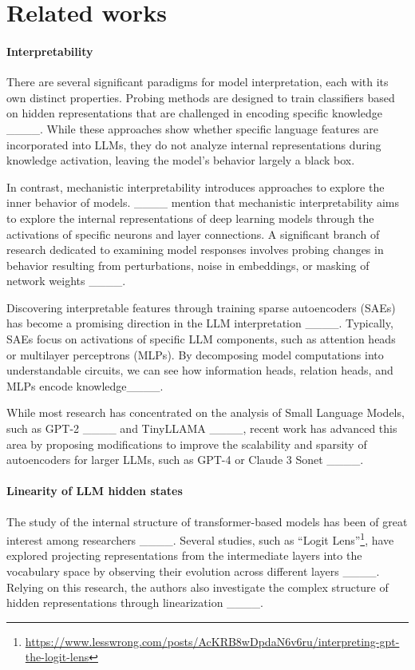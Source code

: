 \section{Related works}
\paragraph{Interpretability} There are several significant paradigms for model interpretation, each with its own distinct properties. Probing methods are designed to train classifiers based on hidden representations that are challenged in encoding specific knowledge ____. While these approaches show whether specific language features are incorporated into LLMs, they do not analyze internal representations during knowledge activation, leaving the model's behavior largely a black box.

In contrast, mechanistic interpretability introduces approaches to explore the inner behavior of models.  ____ mention that mechanistic interpretability aims to explore the internal representations of deep learning models through the activations of specific neurons and layer connections. A significant branch of research dedicated to examining model responses involves probing changes in behavior resulting from perturbations, noise in embeddings, or masking of network weights ____. 

Discovering interpretable features through training sparse autoencoders (SAEs) has become a promising direction in the LLM interpretation ____. Typically, SAEs focus on activations of specific LLM components, such as attention heads or multilayer perceptrons (MLPs). By decomposing model computations into understandable circuits, we can see how information heads, relation heads, and MLPs encode knowledge____.


While most research has concentrated on the analysis of Small Language Models, such as GPT-2 ____ and TinyLLAMA ____, recent work has advanced this area by proposing modifications to improve the scalability and sparsity of autoencoders for larger LLMs, such as GPT-4 or Claude 3 Sonet ____.

\paragraph{Linearity of LLM hidden states}

The study of the internal structure of transformer-based models has been of great interest among researchers ____. Several studies, such as ``Logit Lens''\footnote{\url{https://www.lesswrong.com/posts/AcKRB8wDpdaN6v6ru/interpreting-gpt-the-logit-lens}}, have explored projecting representations from the intermediate layers into the vocabulary space by observing their evolution across different layers ____. Relying on this research, the authors also investigate the complex structure of hidden representations through linearization ____.


